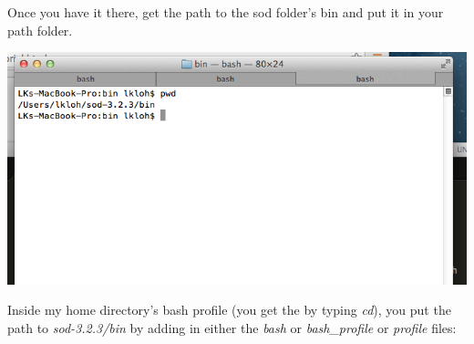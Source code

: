 \documentclass[letterpaper,10pt,english]{sphinxmanual}
\begin{document}
Once you have it there, get the path to the sod folder's bin and put it in your path folder.

\includegraphics{path_to_sod_bin.png}

Inside my home directory's bash profile (you get the by typing \emph{cd}), you put the path to \emph{sod-3.2.3/bin} by adding in either the \emph{bash} or \emph{bash\_profile} or \emph{profile} files:
\end{document}
